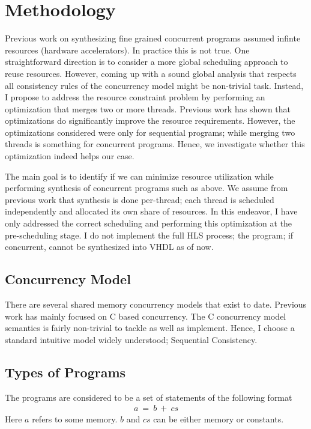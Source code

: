 \section{Methodology}

    Previous work on synthesizing fine grained concurrent programs assumed infinte resources (hardware accelerators).
    In practice this is not true. 
    One straightforward direction is to consider a more global scheduling approach to reuse resources.
    However, coming up with a sound global analysis that respects all consistency rules of the concurrency model might be non-trivial task.
    Instead, I propose to address the resource constraint problem by performing an optimization that merges two or more threads.
    Previous work has shown that optimizations do significantly improve the resource requirements. 
    However, the optimizations considered were only for sequential programs; while merging two threads is something for concurrent programs. 
    Hence, we investigate whether this optimization indeed helps our case.

    The main goal is to identify if we can minimize resource utilization while performing synthesis of concurrent programs such as above.
    We assume from previous work that synthesis is done per-thread; each thread is scheduled independently and allocated its own share of resources.
    In this endeavor, I have only addressed the correct scheduling and performing this optimization at the pre-scheduling stage.
    I do not implement the full HLS process; the program; if concurrent, cannot be synthesized into VHDL as of now. 

    \subsection{Concurrency Model}

        There are several shared memory concurrency models that exist to date.
        Previous work has mainly focused on C based concurrency.
        The C concurrency model semantics is fairly non-trivial to tackle as well as implement. 
        Hence, I choose a standard intuitive model widely understood; Sequential Consistency\cite{Lamport79}. 

    \subsection{Types of Programs}

        The programs are considered to be a set of statements of the following format 
        \begin{align}
            a \ = \ b \ + \ cs
        \end{align}
        Here $a$ refers to some memory.
        $b$ and $cs$ can be either memory or constants. 

